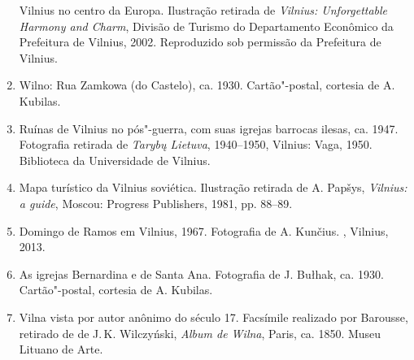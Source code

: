 \begin{enumerate}
  Vilnius no centro da Europa. Ilustração retirada de \emph{Vilnius:
  Unforgettable Harmony and Charm}, Divisão de Turismo do Departamento
  Econômico da Prefeitura de Vilnius, 2002. Reproduzido sob permissão da
  Prefeitura de Vilnius.
\item
  Wilno: Rua Zamkowa (do Castelo), ca. 1930. Cartão"-postal, cortesia de
  A. Kubilas.
\item
  Ruínas de Vilnius no pós"-guerra, com suas igrejas barrocas ilesas, ca.
  1947. Fotografia retirada de \emph{Tarybų Lietuva}, 1940--1950,
  Vilnius: Vaga, 1950. Biblioteca da Universidade de Vilnius.
\item
  Mapa turístico da Vilnius soviética. Ilustração retirada de A. Papšys,
  \emph{Vilnius: a guide}, Moscou: Progress Publishers, 1981, pp. 88--89.
\item
  Domingo de Ramos em Vilnius, 1967. Fotografia de A. Kunčius. ,
  Vilnius, 2013.
\item
  As igrejas Bernardina e de Santa Ana. Fotografia de J. Bułhak, ca.
  1930. Cartão"-postal, cortesia de A. Kubilas.
\item
  Vilna vista por autor anônimo do século 17. Facsímile realizado por
  Barousse, retirado de de J.\,K. Wilczyński, \emph{Album de Wilna},
  Paris, ca. 1850. Museu Lituano de Arte.
\end{enumerate}
